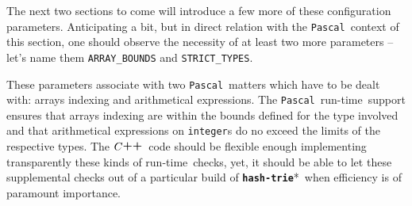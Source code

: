 \documentclass[a4paper,11pt]{article}
\renewcommand{\=}{\protect\nobreakdash-\hspace{0pt}}
\renewcommand{\~}{\protect\nobreakdash--\hspace{0pt}}
\newcommand{\plusplus}{\textbf{\raisebox{1pt}{++}}}
\newcommand{\cplusplus}{$C\plusplus$}
\newcommand{\pascal}{\code{Pascal}}
\newcommand{\hashtrie}{{\tt\textbf{hash-trie}}}
\newcommand\hashtrie*{\emph{hash\=trie}}
\newcommand{\code}[1]{{\tt{#1}}}
\newcommand\code*[1]{\mbox{\code{#1}}}
\newcommand{\runtime}{run\=time}
\begin{document}
The next two sections to come will introduce a few more of these configuration
parameters. Anticipating a bit, but in direct relation with the \pascal\ context
of this section, one should observe the necessity of at least two more
parameters -- let's name them \code{ARRAY\_BOUNDS} and \code{STRICT\_TYPES}.

These parameters associate with two \pascal\ matters which have to be dealt with:
arrays indexing and arithmetical expressions. The \pascal\ \runtime\ support
ensures that arrays indexing are within the bounds defined for the type involved
and that arithmetical expressions on \code{integer}s do no exceed the limits of
the respective types. The \cplusplus\ code should be flexible enough implementing
transparently these kinds of \runtime\ checks, yet, it should be able to let these
supplemental checks out of a particular build of \hashtrie*\ when efficiency is
of paramount importance.
%
\end{document}
